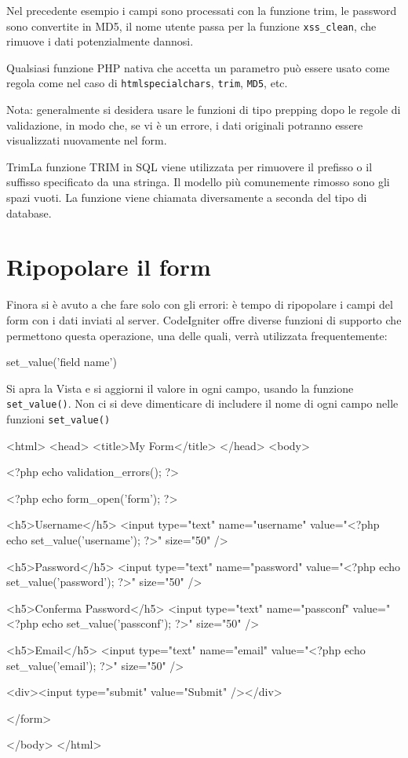 Nel precedente esempio i campi sono processati con la funzione trim, le password sono convertite in MD5, il nome utente passa per la funzione \verb|xss_clean|, che rimuove i dati potenzialmente dannosi.

Qualsiasi funzione \ac{PHP} nativa che accetta un parametro può essere usato come regola come nel caso di \verb|htmlspecialchars|, \verb|trim|, \verb|MD5|, etc.

Nota: generalmente si desidera usare le funzioni di tipo prepping dopo le regole di validazione, in modo che, se vi è un errore, i dati originali potranno essere visualizzati nuovamente nel form.

\begin{deftabv}{Trim}{La funzione TRIM in SQL viene utilizzata per rimuovere il prefisso o il suffisso specificato da una stringa. Il modello più comunemente rimosso sono gli spazi vuoti. La funzione viene chiamata diversamente a seconda del tipo di database.}
\end{deftabv}

\section*{Ripopolare il form}
Finora si è avuto a che fare solo con gli errori: è tempo di ripopolare i campi del form con i dati inviati al server. CodeIgniter offre diverse funzioni di supporto che permettono questa operazione, una delle quali, verrà utilizzata frequentemente:

\begin{code}
set_value('field name')
\end{code}

Si apra la Vista  e si aggiorni il valore in ogni campo, usando la funzione \verb|set_value()|. Non ci si deve dimenticare di includere il nome di ogni campo nelle funzioni \verb|set_value()|

\begin{html}
<html>
<head>
<title>My Form</title>
</head>
<body>

<?php echo validation_errors(); ?>

<?php echo form_open('form'); ?>

<h5>Username</h5>
<input type="text" name="username" value="<?php echo set_value('username'); ?>" size="50" />

<h5>Password</h5>
<input type="text" name="password" value="<?php echo set_value('password'); ?>" size="50" />

<h5>Conferma Password</h5>
<input type="text" name="passconf" value="<?php echo set_value('passconf'); ?>" size="50" />

<h5>Email</h5>
<input type="text" name="email" value="<?php echo set_value('email'); ?>" size="50" />

<div><input type="submit" value="Submit" /></div>

</form>

</body>
</html>
\end{html}

